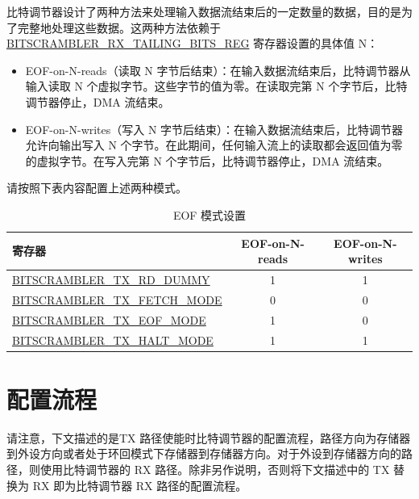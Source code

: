 \documentclass[main\_\_CN.tex]{subfiles}
\begin{document}
\chipname{} 比特调节器设计了两种方法来处理输入数据流结束后的一定数量的数据，目的是为了完整地处理这些数据。这两种方法依赖于 \hyperref[regdesc:BITSCRAMBLERRXTAILINGBITSREG]{BITSCRAMBLER\_RX\_TAILING\_BITS\_REG} 寄存器设置的具体值 N：


\begin{itemize}
\item EOF-on-N-reads（读取 N 字节后结束）：在输入数据流结束后，比特调节器从输入读取 N 个虚拟字节。这些字节的值为零。在读取完第 N 个字节后，比特调节器停止，DMA 流结束。

\item EOF-on-N-writes（写入 N 字节后结束）：在输入数据流结束后，比特调节器允许向输出写入 N 个字节。在此期间，任何输入流上的读取都会返回值为零的虚拟字节。在写入完第 N 个字节后，比特调节器停止，DMA 流结束。
\end{itemize}

请按照下表内容配置上述两种模式。

\begin{table}[H]
\centering
\caption{EOF 模式设置}
\label{tab:bitscrm-settings-for-eof-modes}
\begin{tabular}{|l|c|c|}
\hline\rowcolor{lightgray}
寄存器 & EOF-on-N-reads & EOF-on-N-writes \\
\hline
\hyperref[fielddesc:BITSCRAMBLERTXRDDUMMY]{BITSCRAMBLER\_TX\_RD\_DUMMY} & 1 & 1 \\ \hline
\hyperref[fielddesc:BITSCRAMBLERTXFETCHMODE]{BITSCRAMBLER\_TX\_FETCH\_MODE} & 0 & 0 \\ \hline
\hyperref[fielddesc:BITSCRAMBLERTXEOFMODE]{BITSCRAMBLER\_TX\_EOF\_MODE} & 1 & 0 \\ \hline
\hyperref[fielddesc:BITSCRAMBLERTXHALTMODE]{BITSCRAMBLER\_TX\_HALT\_MODE} & 1 & 1 \\\hline
\end{tabular}
\end{table}


\section{配置流程}
\label{sec:bitscrm-prog-procedures}

请注意，下文描述的是TX 路径使能时比特调节器的配置流程，路径方向为存储器到外设方向或者处于环回模式下存储器到存储器方向。对于外设到存储器方向的路径，则使用比特调节器的 RX 路径。除非另作说明，否则将下文描述中的 TX 替换为 RX 即为比特调节器 RX 路径的配置流程。
\end{document}
